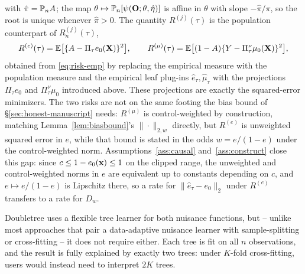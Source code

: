 \documentclass[12pt]{article}
\begin{document}
with $\hat\pi=\mathbb{P}_n A$; the map $\theta\mapsto\mathbb{P}_n[\psi(\mathbf{O};\theta,\hat\eta)]$ is affine in $\theta$ with slope $-\hat\pi/\pi$, so the root is unique whenever $\hat\pi>0$. The quantity $R^{(j)}(\tau)$ is the population counterpart of $R^{(j)}_n(\tau)$,
\begin{equation}\label{eq:risk-pop}
R^{(e)}(\tau)=\mathbb{E}\bigl[\{A-\Pi_\tau e_0(\mathbf{X})\}^2\bigr],
\qquad
R^{(\mu)}(\tau)=\mathbb{E}\bigl[(1-A)\{Y-\Pi^\nu_\tau\mu_0(\mathbf{X})\}^2\bigr],
\end{equation}
obtained from \eqref{eq:risk-emp} by replacing the empirical measure with the population measure and the empirical leaf plug-ins $\hat e_\tau,\hat\mu_\tau$ with the projections $\Pi_\tau e_0$ and $\Pi^\nu_\tau\mu_0$ introduced above. These projections are exactly the squared-error minimizers. The two risks are not on the same footing the bias bound of \S\ref{sec:honest-manuscript} needs: $R^{(\mu)}$ is control-weighted by construction, matching Lemma~\ref{lem:biasbound}'s $\|\cdot\|_{2,w}$ directly, but $R^{(e)}$ is unweighted squared error in $e$, while that bound is stated in the odds $w=e/(1-e)$ under the control-weighted norm. Assumptions~\ref{ass:causal} and~\ref{ass:construct} close this gap: since $c\le1-e_0(\mathbf{x})\le1$ on the clipped range, the unweighted and control-weighted norms in $e$ are equivalent up to constants depending on $c$, and $e\mapsto e/(1-e)$ is Lipschitz there, so a rate for $\|\hat e_\tau-e_0\|_2$ under $R^{(e)}$ transfers to a rate for $D_w$.

\begin{remark}
Doubletree uses a flexible tree learner for both nuisance functions, but -- unlike most approaches that pair a data-adaptive nuisance learner with sample-splitting or cross-fitting \citep{chernozhukov2018} -- it does not require either. Each tree is fit on all $n$ observations, and the result is fully explained by exactly two trees: under $K$-fold cross-fitting, users would instead need to interpret $2K$ trees.
\end{remark}
\end{document}
